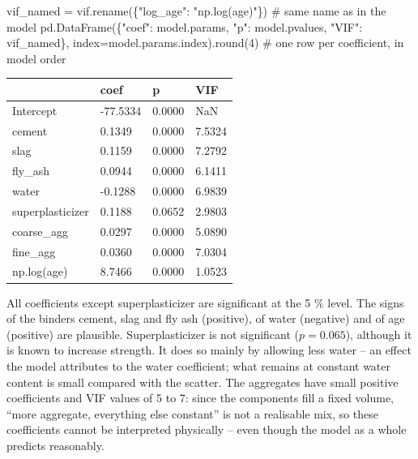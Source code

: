 \documentclass[
  letterpaper,
  DIV=11,
  numbers=noendperiod]{scrreprt}
\newenvironment{Shaded}{\begin{snugshade}}{\end{snugshade}}
\newcommand{\BuiltInTok}[1]{\textcolor[rgb]{0.00,0.23,0.31}{#1}}
\newcommand{\CommentTok}[1]{\textcolor[rgb]{0.37,0.37,0.37}{#1}}
\newcommand{\DecValTok}[1]{\textcolor[rgb]{0.68,0.00,0.00}{#1}}
\newcommand{\NormalTok}[1]{\textcolor[rgb]{0.00,0.23,0.31}{#1}}
\newcommand{\OperatorTok}[1]{\textcolor[rgb]{0.37,0.37,0.37}{#1}}
\newcommand{\StringTok}[1]{\textcolor[rgb]{0.13,0.47,0.30}{#1}}
\begin{document}
\begin{tcolorbox}[enhanced jigsaw, left=2mm, title=\textcolor{quarto-callout-caution-color}{\faFire}\hspace{0.5em}{Solution to Exercise 3}, opacityback=0, breakable, rightrule=.15mm, arc=.35mm, toptitle=1mm, colbacktitle=quarto-callout-caution-color!10!white, opacitybacktitle=0.6, coltitle=black, colframe=quarto-callout-caution-color-frame, bottomrule=.15mm, leftrule=.75mm, bottomtitle=1mm, titlerule=0mm, toprule=.15mm, colback=white]

\begin{Shaded}
\begin{Highlighting}[]
\NormalTok{vif\_named }\OperatorTok{=}\NormalTok{ vif.rename(\{}\StringTok{"log\_age"}\NormalTok{: }\StringTok{"np.log(age)"}\NormalTok{\})           }\CommentTok{\# same name as in the model}
\NormalTok{pd.DataFrame(\{}\StringTok{"coef"}\NormalTok{: model.params, }\StringTok{"p"}\NormalTok{: model.pvalues, }\StringTok{"VIF"}\NormalTok{: vif\_named\},}
\NormalTok{             index}\OperatorTok{=}\NormalTok{model.params.index).}\BuiltInTok{round}\NormalTok{(}\DecValTok{4}\NormalTok{)              }\CommentTok{\# one row per coefficient, in model order}
\end{Highlighting}
\end{Shaded}

\begin{longtable}[]{@{}llll@{}}
\toprule\noalign{}
& coef & p & VIF \\
\midrule\noalign{}
\endhead
\bottomrule\noalign{}
\endlastfoot
Intercept & -77.5334 & 0.0000 & NaN \\
cement & 0.1349 & 0.0000 & 7.5324 \\
slag & 0.1159 & 0.0000 & 7.2792 \\
fly\_ash & 0.0944 & 0.0000 & 6.1411 \\
water & -0.1288 & 0.0000 & 6.9839 \\
superplasticizer & 0.1188 & 0.0652 & 2.9803 \\
coarse\_agg & 0.0297 & 0.0000 & 5.0890 \\
fine\_agg & 0.0360 & 0.0000 & 7.0304 \\
np.log(age) & 8.7466 & 0.0000 & 1.0523 \\
\end{longtable}

All coefficients except superplasticizer are significant at the 5 \%
level. The signs of the binders cement, slag and fly ash (positive), of
water (negative) and of age (positive) are plausible. Superplasticizer
is not significant (\(p = 0.065\)), although it is known to increase
strength. It does so mainly by allowing less water -- an effect the
model attributes to the water coefficient; what remains at constant
water content is small compared with the scatter. The aggregates have
small positive coefficients and VIF values of 5 to 7: since the
components fill a fixed volume, ``more aggregate, everything else
constant'' is not a realisable mix, so these coefficients cannot be
interpreted physically -- even though the model as a whole predicts
reasonably.

\end{tcolorbox}
\end{document}
